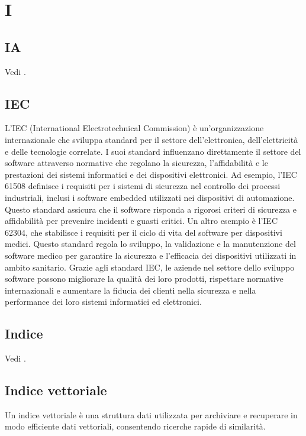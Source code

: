 \section{I}

\vspace{2em}
\subsection*{IA}
\par Vedi .

\vspace{2em}
\subsection*{IEC}
\par L'IEC (International Electrotechnical Commission) è un'organizzazione internazionale che sviluppa standard per il settore dell'elettronica, dell'elettricità e delle tecnologie correlate. I suoi standard influenzano direttamente il settore del software attraverso normative che regolano la sicurezza, l'affidabilità e le prestazioni dei sistemi informatici e dei dispositivi elettronici.
Ad esempio, l'IEC 61508 definisce i requisiti per i sistemi di sicurezza nel controllo dei processi industriali, inclusi i software embedded utilizzati nei dispositivi di automazione. Questo standard assicura che il software risponda a rigorosi criteri di sicurezza e affidabilità per prevenire incidenti e guasti critici.
Un altro esempio è l'IEC 62304, che stabilisce i requisiti per il ciclo di vita del software per dispositivi medici. Questo standard regola lo sviluppo, la validazione e la manutenzione del software medico per garantire la sicurezza e l'efficacia dei dispositivi utilizzati in ambito sanitario.
Grazie agli standard IEC, le aziende nel settore dello sviluppo software possono migliorare la qualità dei loro prodotti, rispettare normative internazionali e aumentare la fiducia dei clienti nella sicurezza e nella performance dei loro sistemi informatici ed elettronici.

\vspace{2em}
\subsection*{Indice}
\par Vedi .

\vspace{2em}
\subsection*{Indice vettoriale}
\par Un indice vettoriale è una struttura dati utilizzata per archiviare e recuperare in modo efficiente dati vettoriali, consentendo ricerche rapide di similarità.

